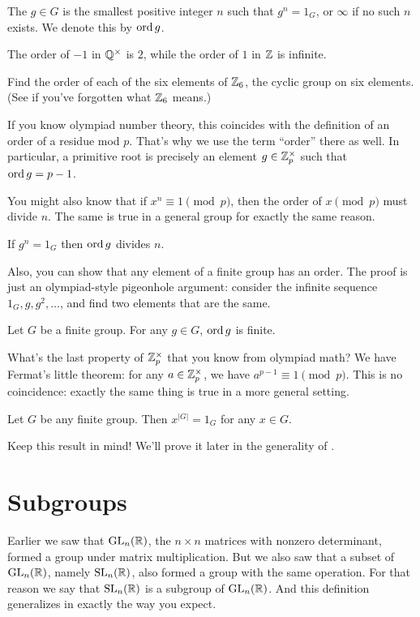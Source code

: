 \begin{definition}
	The  $g \in G$ is the smallest positive integer $n$
	such that $g^n = 1_G$, or $\infty$ if no such $n$ exists.
	We denote this by $\operatorname{ord} g$.
\end{definition}
\begin{example}
	The order of $-1$ in $\mathbb Q^\times$ is $2$,
	while the order of $1$ in $\mathbb Z$ is infinite.
\end{example}
\begin{ques}
	Find the order of each of the six elements of $\mathbb Z_{6}$,
	the cyclic group on six elements.
	(See  if you've forgotten what $\mathbb Z_{6}$ means.)
\end{ques}
\begin{example}
	If you know olympiad number theory, this coincides with the definition of an order of a residue mod $p$.
	That's why we use the term ``order'' there as well.
	In particular, a primitive root is precisely an element $g \in \mathbb Z_{p}^\times$
	such that $\operatorname{ord} g = p-1$.
\end{example}
You might also know that if $x^n \equiv 1 \pmod p$,
then the order of $x \pmod p$ must divide $n$.
The same is true in a general group for exactly the same reason.
\begin{fact}
	If $g^n = 1_G$ then $\operatorname{ord} g$ divides $n$.
\end{fact}
Also, you can show that any element of a finite group has an order.
The proof is just an olympiad-style pigeonhole argument: consider the infinite sequence $1_G, g, g^2, \dots$, and find two elements that are the same.
\begin{fact}
	Let $G$ be a finite group.
	For any $g \in G$, $\operatorname{ord} g$ is finite.
\end{fact}

What's the last property of $\mathbb Z_{p}^\times$ that you know from olympiad math?
We have Fermat's little theorem: for any $a \in \mathbb Z_{p}^\times$,
we have $a^{p-1} \equiv 1 \pmod p$.
This is no coincidence:
exactly the same thing is true in a more general setting.

\begin{theorem}
	Let $G$ be any finite group.
	Then $x^{\left\lvert G \right\rvert} = 1_G$ for any $x \in G$.
\end{theorem}
Keep this result in mind! We'll prove it later in
the generality of .

\section{Subgroups}
Earlier we saw that $\operatorname{GL}_n(\mathbb R)$, the $n \times n$ matrices with nonzero determinant, formed a group under matrix multiplication.
But we also saw that a subset of $\operatorname{GL}_n(\mathbb R)$, namely $\operatorname{SL}_n(\mathbb R)$, also formed a group with the same operation.
For that reason we say that $\operatorname{SL}_n(\mathbb R)$ is a subgroup of $\operatorname{GL}_n(\mathbb R)$.
And this definition generalizes in exactly the way you expect.

